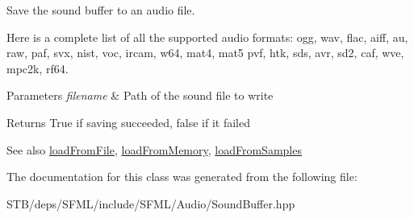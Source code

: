 Save the sound buffer to an audio file. 

Here is a complete list of all the supported audio formats\+: ogg, wav, flac, aiff, au, raw, paf, svx, nist, voc, ircam, w64, mat4, mat5 pvf, htk, sds, avr, sd2, caf, wve, mpc2k, rf64.


\begin{DoxyParams}{Parameters}
{\em filename} & Path of the sound file to write\\
\hline
\end{DoxyParams}
\begin{DoxyReturn}{Returns}
True if saving succeeded, false if it failed
\end{DoxyReturn}
\begin{DoxySeeAlso}{See also}
\hyperlink{classsf_1_1_sound_buffer_a2be6a8025c97eb622a7dff6cf2594394}{load\+From\+File}, \hyperlink{classsf_1_1_sound_buffer_af8cfa5599739a7edae69c5cba273d33f}{load\+From\+Memory}, \hyperlink{classsf_1_1_sound_buffer_a63da986e144b578135edd48e51c565e8}{load\+From\+Samples} 
\end{DoxySeeAlso}


The documentation for this class was generated from the following file\+:\begin{DoxyCompactItemize}
\item 
S\+T\+B/deps/\+S\+F\+M\+L/include/\+S\+F\+M\+L/\+Audio/Sound\+Buffer.\+hpp\end{DoxyCompactItemize}
